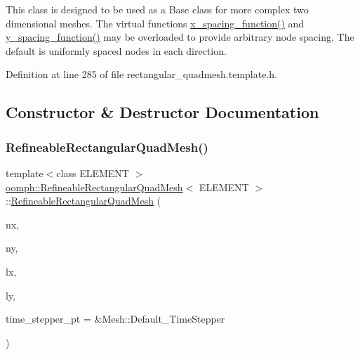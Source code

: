 This class is designed to be used as a Base class for more complex two dimensional meshes. The virtual functions \hyperlink{classoomph_1_1RectangularQuadMesh_ad4c2f349cf201cb3107f0a4e5447c16f}{x\+\_\+spacing\+\_\+function()} and \hyperlink{classoomph_1_1RectangularQuadMesh_ae78204de1f176cdf2e819673bd34e78a}{y\+\_\+spacing\+\_\+function()} may be overloaded to provide arbitrary node spacing. The default is uniformly spaced nodes in each direction. 

Definition at line 285 of file rectangular\+\_\+quadmesh.\+template.\+h.



\subsection{Constructor \& Destructor Documentation}
\mbox{\label{classoomph_1_1RefineableRectangularQuadMesh_ac00e380a8fa1bdfc63fd25fdf9b5fbf0}} 
\subsubsection{\texorpdfstring{Refineable\+Rectangular\+Quad\+Mesh()}{RefineableRectangularQuadMesh()}\hspace{0.1cm}{\footnotesize\ttfamily [1/4]}}
{\footnotesize\ttfamily template$<$class E\+L\+E\+M\+E\+NT $>$ \\
\hyperlink{classoomph_1_1RefineableRectangularQuadMesh}{oomph\+::\+Refineable\+Rectangular\+Quad\+Mesh}$<$ E\+L\+E\+M\+E\+NT $>$\+::\hyperlink{classoomph_1_1RefineableRectangularQuadMesh}{Refineable\+Rectangular\+Quad\+Mesh} (\begin{DoxyParamCaption}\item[{const unsigned \&}]{nx,  }\item[{const unsigned \&}]{ny,  }\item[{const double \&}]{lx,  }\item[{const double \&}]{ly,  }\item[{Time\+Stepper $\ast$}]{time\+\_\+stepper\+\_\+pt = {\ttfamily \&Mesh\+:\+:Default\+\_\+TimeStepper} }\end{DoxyParamCaption})\hspace{0.3cm}{\ttfamily [inline]}}



